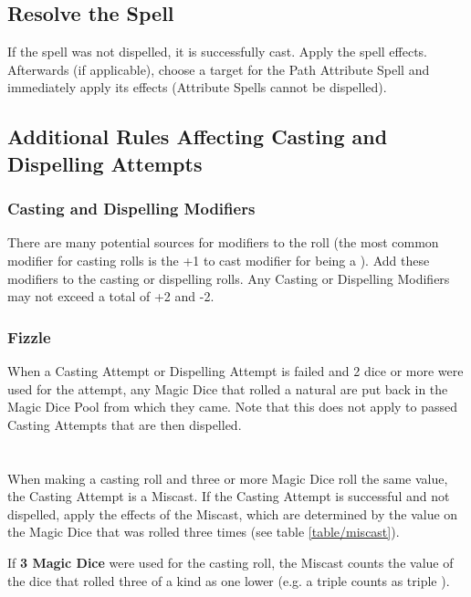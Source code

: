 \subsection{Resolve the Spell}

If the spell was not dispelled, it is successfully cast. Apply the spell effects. Afterwards (if applicable), choose a target for the Path Attribute Spell and immediately apply its effects (Attribute Spells cannot be dispelled).

\subsection{Additional Rules Affecting Casting and Dispelling Attempts}

\subsubsection{Casting and Dispelling Modifiers}
\label{casting_and_dispelling_modifiers}

There are many potential sources for modifiers to the roll (the most common modifier for casting rolls is the +1 to cast modifier for being a \wizardmaster{}). Add these modifiers to the casting or dispelling rolls. Any Casting or Dispelling Modifiers may not exceed a total of +2 and -2.

\subsubsection{Fizzle}
\label{fizzle}

When a Casting Attempt or Dispelling Attempt is failed and 2 dice or more were used for the attempt, any Magic Dice that rolled a natural  are put back in the Magic Dice Pool from which they came. Note that this does not apply to passed Casting Attempts that are then dispelled.

\section{\miscast}
\label{miscast}

When making a casting roll and three or more Magic Dice roll the same value, the Casting Attempt is a Miscast. If the Casting Attempt is successful and not dispelled, apply the effects of the Miscast, which are determined by the value on the Magic Dice that was rolled three times (see table \ref{table/miscast}).

If \textbf{3 Magic Dice} were used for the casting roll, the Miscast counts the value of the dice that rolled three of a kind as one lower (e.g. a triple  counts as triple ).

